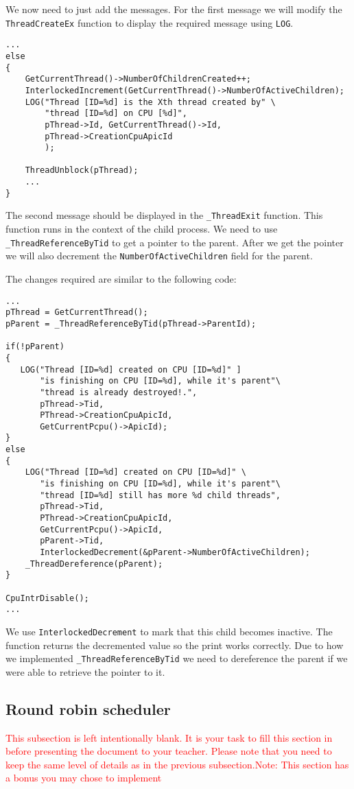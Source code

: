 \documentclass[a4paper,12pt]{report}
\begin{document}
 We now need to just add the messages. For the first message we will modify the \lstinline|ThreadCreateEx| function to display the required message using \lstinline|LOG|.
 
 \begin{lstlisting}
... 
else
{
    GetCurrentThread()->NumberOfChildrenCreated++; 
    InterlockedIncrement(GetCurrentThread()->NumberOfActiveChildren);
    LOG("Thread [ID=%d] is the Xth thread created by" \
        "thread [ID=%d] on CPU [%d]",
        pThread->Id, GetCurrentThread()->Id, 
        pThread->CreationCpuApicId
        );
     
    ThreadUnblock(pThread);
    ... 
}

\end{lstlisting}
 
The second message should be displayed in the \lstinline{_ThreadExit} function. This function runs in the context of the child process. We need to use \lstinline|_ThreadReferenceByTid| to get a pointer to the parent. After we get the pointer we will also decrement the \lstinline|NumberOfActiveChildren| field for the parent.

The changes required are similar to the following code:
\begin{lstlisting}
...
pThread = GetCurrentThread();
pParent = _ThreadReferenceByTid(pThread->ParentId);

if(!pParent)
{
   LOG("Thread [ID=%d] created on CPU [ID=%d]" ]
       "is finishing on CPU [ID=%d], while it's parent"\
       "thread is already destroyed!.",
       pThread->Tid,
       PThread->CreationCpuApicId,
       GetCurrentPcpu()->ApicId);
}
else
{
    LOG("Thread [ID=%d] created on CPU [ID=%d]" \
       "is finishing on CPU [ID=%d], while it's parent"\
       "thread [ID=%d] still has more %d child threads",
       pThread->Tid,
       PThread->CreationCpuApicId,
       GetCurrentPcpu()->ApicId,
       pParent->Tid,
       InterlockedDecrement(&pParent->NumberOfActiveChildren);
    _ThreadDereference(pParent);
}

CpuIntrDisable();
...
\end{lstlisting}
 
We use \lstinline|InterlockedDecrement| to mark that this child becomes inactive. The function returns the decremented value so the print works correctly.
Due to how we implemented \lstinline |_ThreadReferenceByTid| we need to dereference the parent if we were able to retrieve the pointer to it.


\subsection{Round robin scheduler}
  \textcolor{red}{This subsection is left intentionally blank. It is your task to fill this section in before presenting the document to your teacher. Please note that you need to keep the same level of details as in the previous subsection.Note: This section has a bonus you may chose to implement } 
 
\end{document}
